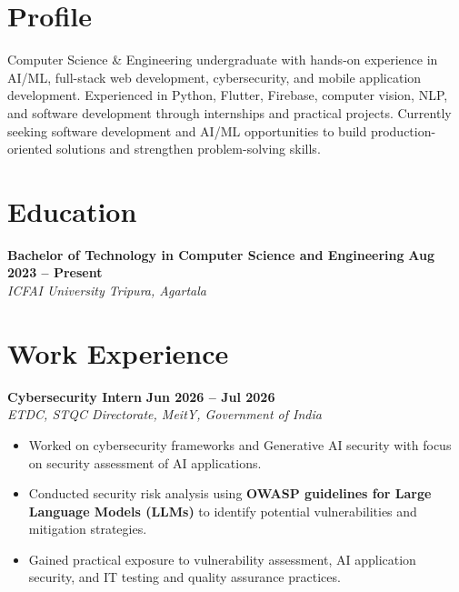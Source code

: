 \documentclass[10pt,a4paper]{article}
\newcommand{\resumeWorkHeading}[3]{
    \textbf{#1}
    \hfill
    \textbf{#3}
    \\
    \textit{#2}
    \vspace{1pt}
}
\begin{document}

\section{Profile}

\begin{justify}
Computer Science \& Engineering undergraduate with hands-on experience in
AI/ML, full-stack web development, cybersecurity, and mobile application
development. Experienced in Python, Flutter, Firebase, computer vision,
NLP, and software development through internships and practical projects.
Currently seeking software development and AI/ML opportunities to build
production-oriented solutions and strengthen problem-solving skills.
\end{justify}


\section{Education}

\resumeWorkHeading
{Bachelor of Technology in Computer Science and Engineering}
{ICFAI University Tripura, Agartala}
{Aug 2023 -- Present}

\vspace{2pt}


\section{Work Experience}


\resumeWorkHeading
{Cybersecurity Intern}
{ETDC, STQC Directorate, MeitY, Government of India}
{Jun 2026 -- Jul 2026}

\begin{itemize}[leftmargin=14pt, itemsep=1pt, topsep=1pt]
    \item Worked on cybersecurity frameworks and Generative AI security with
    focus on security assessment of AI applications.
    
    \item Conducted security risk analysis using
    \textbf{OWASP guidelines for Large Language Models (LLMs)} to identify
    potential vulnerabilities and mitigation strategies.
    
    \item Gained practical exposure to vulnerability assessment,
    AI application security, and IT testing and quality assurance practices.
\end{itemize}
\end{document}
